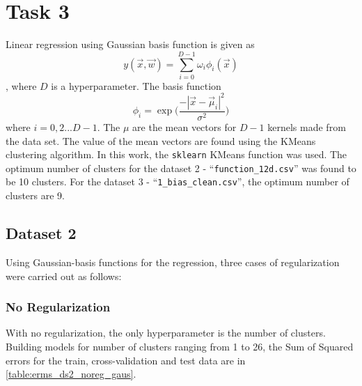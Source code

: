 \documentclass[12pt,a4paper]{article}
\def\tt#1{\texttt{#1}}
\begin{document}
\break
\section{Task 3}
Linear regression using Gaussian basis function is given as 
\begin{equation}
    y(\vec{x},\vec{w}) = \sum_{i=0}^{D-1} \omega_{i}\phi_{i}(\vec{x})
\end{equation},
where $D$ is a hyperparameter. The basis function 
\begin{equation}
    \phi_{i} = \exp\Big(\frac{-|\vec{x} - \vec{\mu}_i|^2}{\sigma^2}\Big)
\end{equation}
where $i = 0,2 ... D-1$. The $\mu$ are the mean vectors for $D-1$ kernels made from the data set. The value of the mean vectors are found using the KMeans clustering algorithm. In this work, the \tt{sklearn} KMeans function was used. The optimum number of clusters for the dataset 2 - ``\texttt{function\_12d.csv}'' was found to be 10 clusters. For the dataset 3 - ``\tt{1\_bias\_clean.csv}'', the optimum number of clusters are 9.

\subsection{Dataset 2}
Using Gaussian-basis functions for the regression, three cases of regularization were carried out as follows:

\subsubsection{No Regularization}
With no regularization, the only hyperparameter is the number of clusters. Building models for number of clusters ranging from 1 to 26, the Sum of Squared errors for the train, cross-validation and test data are in \autoref{table:erms_ds2_noreg_gaus}.

\end{document}
